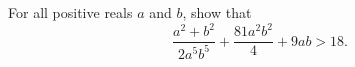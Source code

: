 For all positive reals $a$ and $b$,  show that$$\frac{a^2+b^2}{2a^5b^5} + \frac{81a^2b^2}{4} + 9ab > 18.$$